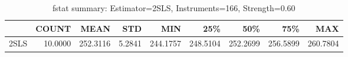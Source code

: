 \begin{table}[ht]
\centering
\caption{fstat summary: Estimator=2SLS, Instruments=166, Strength=0.60}
\begin{tabular}{lrrrrrrrr}
\toprule
 & COUNT & MEAN & STD & MIN & 25\% & 50\% & 75\% & MAX \\
\midrule
2SLS & 10.0000 & 252.3116 & 5.2841 & 244.1757 & 248.5104 & 252.2699 & 256.5899 & 260.7804 \\
\bottomrule
\end{tabular}
\end{table}
